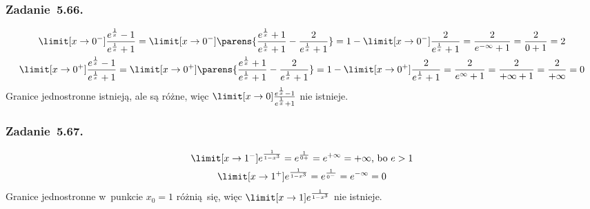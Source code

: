 \subsubsection*{Zadanie~5.66.}
\begin{gather*}
    \limit[x \to 0^-] \frac{e^{\frac{1}{x}} - 1}{e^{\frac{1}{x}} + 1}
        = \limit[x \to 0^-] \parens{\frac{e^{\frac{1}{x}} + 1}{e^{\frac{1}{x}} + 1} - \frac{2}{e^{\frac{1}{x}} + 1}}
        = 1 - \limit[x \to 0^-] \frac{2}{e^{\frac{1}{x}} + 1}
        = \frac{2}{e^{-\infty} + 1}
        = \frac{2}{0 + 1}
        = 2\\
    \limit[x \to 0^+] \frac{e^{\frac{1}{x}} - 1}{e^{\frac{1}{x}} + 1}
        = \limit[x \to 0^+] \parens{\frac{e^{\frac{1}{x}} + 1}{e^{\frac{1}{x}} + 1} - \frac{2}{e^{\frac{1}{x}} + 1}}
        = 1 - \limit[x \to 0^+] \frac{2}{e^{\frac{1}{x}} + 1}
        = \frac{2}{e^{\infty} + 1}
        = \frac{2}{+\infty + 1}
        = \frac{2}{+\infty}
        = 0
\end{gather*}
Granice jednostronne istnieją, ale są różne, więc \(\limit[x \to 0] \frac{e^{\frac{1}{x}} - 1}{e^{\frac{1}{x}} + 1}\) nie istnieje.
\subsubsection*{Zadanie~5.67.}
\begin{gather*}
    \limit[x \to 1^-] e^{\frac{1}{1 - x^3}}
        = e^{\frac{1}{0+}}
        = e^{+\infty}
        = +\infty \text{, bo } e > 1\\
    \limit[x \to 1^+] e^{\frac{1}{1 - x^3}}
        = e^{\frac{1}{0^-}}
        = e^{-\infty}
        = 0
\end{gather*}
Granice jednostronne w~punkcie \(x_0 = 1\) różnią się, więc \(\limit[x \to 1] e^{\frac{1}{1 - x^3}}\) nie istnieje.
